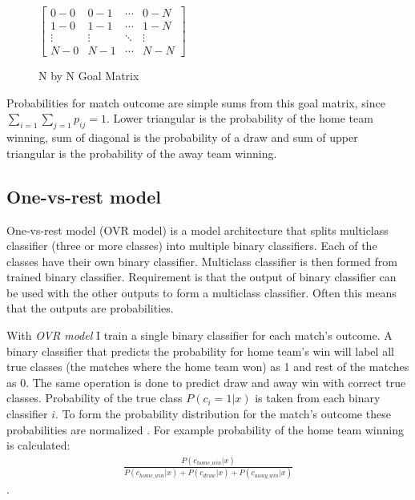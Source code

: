 \begin{figure}
    $\begin{bmatrix}
    0-0 & 0-1 & \cdots & 0-N \\
    1-0 & 1-1 & \cdots   &1-N \\
    \vdots & \vdots   & \ddots & \vdots \\
    N-0 & N-1 & \cdots & N-N\end{bmatrix}$
\caption{N by N Goal Matrix}
\label{fig:goal_matrix}
\end{figure}

Probabilities for match outcome are simple sums from this goal matrix, since $\sum_{i=1}\sum_{j=1}p_{ij} = 1$. Lower triangular is the probability of the home team winning, sum of diagonal is the probability of a draw and sum of upper triangular is the probability of the away team winning.

\subsection{One-vs-rest model}
One-vs-rest model (OVR model) is a model architecture that splits multiclass classifier (three or more classes) into multiple binary classifiers. Each of the classes have their own binary classifier. Multiclass classifier is then formed from trained binary classifier. Requirement is that the output of binary classifier can be used with the other outputs to form a multiclass classifier. Often this means that the outputs are probabilities.

With \textit{OVR model} I train a single binary classifier for each match's outcome. A binary classifier that predicts the probability for home team's win will label all true classes (the matches where the home team won) as 1 and rest of the matches as 0. The same operation is done to predict draw and away win with correct true classes. Probability of the true class $P(c_i = 1 | x)$ is taken from each binary classifier $i$. To form the probability distribution for the match's outcome these probabilities are normalized \cite{zadrozny2002transforming}. For example probability of the home team winning is calculated:
\begin{align*}
\frac{P(c_{home\_win}| x)}{P(c_{home\_win}| x) + P(c_{draw}| x) + P(c_{away\_win}| x)}
\end{align*}.

